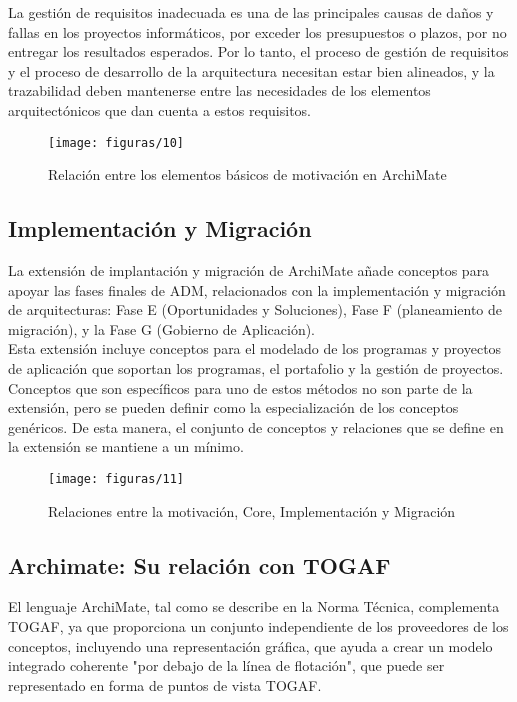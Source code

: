   La gestión de requisitos inadecuada es una de las principales causas de daños y fallas en los proyectos informáticos, por exceder los presupuestos o plazos, por no entregar los resultados esperados. Por lo tanto, el proceso de gestión de requisitos y el proceso de desarrollo de la arquitectura necesitan estar bien alineados, y la trazabilidad deben mantenerse entre las necesidades de los elementos arquitectónicos que dan cuenta a estos requisitos.
 
  \begin{figure}[H]
   	\centering
   	\texttt{[image: figuras/10]}
   	\captionsetup{width=.95\textwidth}
   	\caption{Relación entre los elementos básicos de motivación en ArchiMate \cite{ref9}}
   	\label{figura10}
  \end{figure}
  
  \subsection{Implementación y Migración}
  La extensión de implantación y migración de ArchiMate añade conceptos para apoyar las fases finales de ADM, relacionados con la implementación y migración de arquitecturas: Fase E (Oportunidades y Soluciones), Fase F (planeamiento de migración), y la Fase G (Gobierno de Aplicación). \\
  
  Esta extensión incluye conceptos para el modelado de los programas y proyectos de aplicación que soportan los programas, el portafolio y la gestión de proyectos. Conceptos que son específicos para uno de estos métodos no son parte de la extensión, pero se pueden definir como la especialización de los conceptos genéricos. De esta manera, el conjunto de conceptos y relaciones que se define en la extensión se mantiene a un mínimo.

  \begin{figure}[H]
  	\centering
   	\texttt{[image: figuras/11]}
   	\captionsetup{width=.95\textwidth}
   	\caption{Relaciones entre la motivación, Core, Implementación y Migración \cite{ref9}}
   	\label{figura11}
  \end{figure}

   \subsection{Archimate: Su relación con TOGAF}
   El lenguaje ArchiMate, tal como se describe en la Norma Técnica, complementa TOGAF, ya que proporciona un conjunto independiente de los proveedores de los conceptos, incluyendo una representación gráfica, que ayuda a crear un modelo integrado coherente "por debajo de la línea de flotación", que puede ser representado en forma de puntos de vista TOGAF. \\
   
